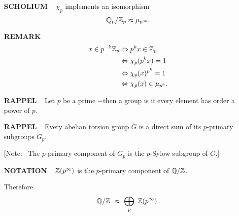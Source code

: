 \begin{x}{\small\bf SCHOLIUM} \ %
$\chi_p$ implements an isomorphism
\[
\mathbb{Q}_p/\mathbb{Z}_p \thickapprox \mu_{p^\infty}.
\]
\end{x}

\vspace{0.1cm}

\begin{x}{\small\bf REMARK} \ %
\begin{align*}
x \in p^{-k}\mathbb{Z}_p	&\Leftrightarrow p^{k}x \in \mathbb{Z}_p\\	
								&\Leftrightarrow \chi_p(p^{k}x) = 1\\
								&\Leftrightarrow \chi_p(x)^{p^k} = 1\\
								&\Leftrightarrow \chi_p(x) \in \mu_{p^k}.
\end{align*}
\end{x}

\vspace{0.1cm}

\begin{x}{\small\bf RAPPEL} \ %
Let $p$ be a prime $-$then a group is 
if every element has order a power of $p$.
\end{x}
\vspace{0.1cm}

\begin{x}{\small\bf RAPPEL} \ %
Every abelian torsion group $G$ is a direct sum of its $p$-primary subgroups $G_p$.
\end{x}

\vspace{0.1cm}

[Note: \ The $p$-primary component of $G_p$ is the $p$-Sylow subgroup of $G$.]

\vspace{0.1cm}

\begin{x}{\small\bf NOTATION} \ %
$\mathbb{Z}(p^\infty)$ is the $p$-primary component of  $\mathbb{Q} /  \mathbb{Z}$.  

Therefore
\[
\Q / \Z \ \thickapprox \ \bigoplus_p \ \Z(p^\infty).
\]
\end{x}
\vspace{0.1cm}

